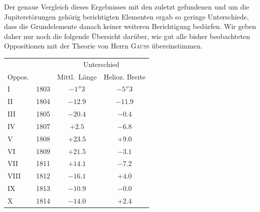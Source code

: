 \par\indent Der genaue Vergleich dieses Ergebnisses mit den zuletzt gefundenen und um die Jupiterstörungen gehörig berichtigten Elementen ergab so geringe Unterschiede, dass die Grundelemente danach keiner weiteren Berichtigung bedürfen. Wir geben daher nur noch die folgende Übersicht darüber, wie gut alle bisher beobachteten Oppositionen mit der Theorie von Herrn \textsc{Gauss} übereinstimmen.

\begin{center}
\fontsize{10}{12}\selectfont\setlength{\tabcolsep}{5pt}\renewcommand{\arraystretch}{1.15}\begin{tabular}{ll|cc}
 & & \multicolumn{2}{c}{Unterschied} \\
Oppos. & & Mittl.\ Länge & Helioz. Breite \\
\hline
I & 1803 & $-1''3$ & $-5''3$ \\
II & 1804 & $-12.9$ & $-11.9$ \\
III & 1805 & $-20.4$ & $-0.4$ \\
IV & 1807 & $+2.5$ & $-6.8$ \\
V & 1808 & $+23.5$ & $+9.0$ \\
VI & 1809 & $+21.5$ & $-3.1$ \\
VII & 1811 & $+14.1$ & $-7.2$ \\
VIII & 1812 & $-16.1$ & $+4.0$ \\
IX & 1813 & $-10.9$ & $-0.0$ \\
X & 1814 & $-14.0$ & $+2.4$ \\
\end{tabular}
\end{center}
